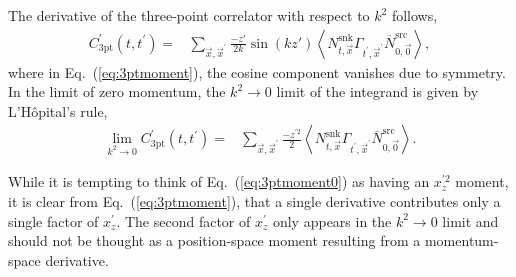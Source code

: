 \documentclass[prd,aps,twocolumn,superscriptaddress,tightenlines,nofootinbib,floatfix,preprintnumbers,10pt]{revtex4-1}
\begin{document}
The derivative of the three-point correlator with respect to $k^2$ follows,
\begin{align}
C^\prime_{\text{3pt}}(t, t^\prime)
=& \sum_{\vec{x},\vec{x}^\prime} \frac{-z'}{2k}\sin\left(k z'\right) \left<N^{\mathrm{snk}}_{t,\vec{x}}\Gamma_{t^\prime,\vec{x}^\prime} \overline{N}^{\mathrm{src}}_{0,\vec{0}}\right>, 
\label{eq:3ptmoment}
\end{align}
where in Eq.~(\ref{eq:3ptmoment}), the cosine component vanishes due to symmetry. In the limit of zero momentum, the $k^2 \rightarrow 0$ limit of the integrand is given by L'H\^opital's rule,
\begin{align}
\lim_{k^2 \rightarrow 0} C^\prime_{\text{3pt}}(t, t^\prime) = & \sum_{\vec{x},\vec{x}^\prime}\frac{-z^{\prime 2}}{2}\left<N^{\mathrm{snk}}_{t,\vec{x}}\Gamma_{t^\prime,\vec{x}^\prime} \overline{N}^{\mathrm{src}}_{0,\vec{0}}\right>.
\label{eq:3ptmoment0}
\end{align}

While it is tempting to think of Eq.~(\ref{eq:3ptmoment0}) as having an $x^{\prime 2}_z$ moment, it is clear from Eq.~(\ref{eq:3ptmoment}), that a single derivative contributes only a single factor of $x^{\prime}_z$. The second factor of $x^{\prime}_z$ only appears in the $k^2\rightarrow 0$ limit and should not be thought as a position-space moment resulting from a momentum-space derivative.
\end{document}
